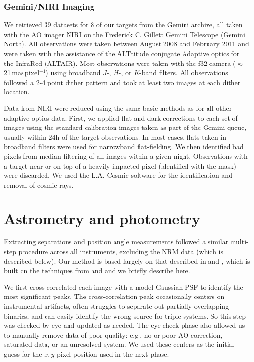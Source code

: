 \documentclass[twocolumn]{aastex62}
\begin{document}
\subsubsection{Gemini/NIRI Imaging}

We retrieved 39 datasets for 8 of our targets from the Gemini archive, all taken with the AO imager NIRI \citep{2003PASP..115.1388H} on the Frederick C. Gillett Gemini Telescope (Gemini North). All observations were taken between August 2008 and February 2011 and were taken with the assistance of the ALTtitude conjugate Adaptive optics for the InfraRed (ALTAIR). Most observations were taken with the f32 camera ($\approx$21\,mas\,pixel$^{-1}$) using broadband $J$-, $H$-, or $K$-band filters. All observations followed a 2-4 point dither pattern and took at least two images at each dither location. 

Data from NIRI were reduced using the same basic methods as for all other adaptive optics data. First, we applied flat and dark corrections to each set of images using the standard calibration images taken as part of the Gemini queue, usually within 24h of the target observations. In most cases, flats taken in broadband filters were used for narrowband flat-fielding. We then identified bad pixels from median filtering of all images within a given night. Observations with a target near or on top of a heavily impacted pixel (identified with the mask) were discarded. We used the L.A. Cosmic software for the identification and removal of cosmic rays. 

\section{Astrometry and photometry}\label{sec:astrometry}

Extracting separations and position angle measurements followed a similar multi-step procedure across all instruments, excluding the NRM data (which is described below). Our method is based largely on that described in \citet{2016ApJ...817...80D} and \citet{Dupuy2017}, which is built on the techniques from \citet{2008ApJ...689..436L} and \citet{2010ApJ...721.1725D} and we briefly describe here. 

We first cross-correlated each image with a model Gaussian PSF to identify the most significant peaks. The cross-correlation peak occasionally centers on instrumental artifacts, often struggles to separate out partially overlapping binaries, and can easily identify the wrong source for triple systems. So this step was checked by eye and updated as needed. The eye-check phase also allowed us to manually remove data of poor quality: e.g., no or poor AO correction, saturated data, or an unresolved system. We used these centers as the initial guess for the $x, y$ pixel position used in the next phase. 
\end{document}
